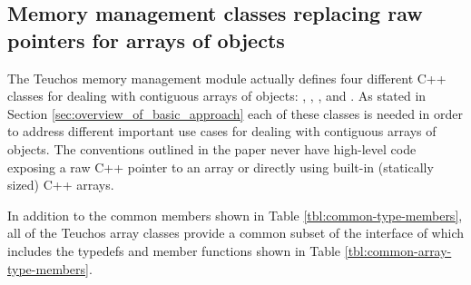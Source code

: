 \documentclass[pdf,ps2pdf,11pt]{SANDreport}
\begin{document}
%
{}\subsection{Memory management classes replacing raw pointers for
arrays of objects}
\label{sec:array-classes}
%

The Teuchos memory management module actually defines four different
C++ classes for dealing with contiguous arrays of objects:
{}, {}, {}, and {}.
As stated in Section {}\ref{sec:overview_of_basic_approach} each of
these classes is needed in order to address different important use
cases for dealing with contiguous arrays of objects.  The conventions
outlined in the paper never have high-level code exposing a raw C++
pointer to an array or directly using built-in (statically sized) C++
arrays.

In addition to the common members shown in Table
{}\ref{tbl:common-type-members}, all of the Teuchos array classes
provide a common subset of the interface of {} which
includes the typedefs and member functions shown in Table
{}\ref{tbl:common-array-type-members}.
\end{document}
